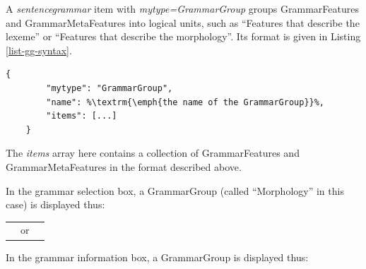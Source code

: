 \documentclass[11pt,oneside,a4paper]{memoir}
\begin{document}
A \emph{sentencegrammar} item with \emph{mytype=GrammarGroup} groups GrammarFeatures and
GrammarMetaFeatures into logical units, such as ``Features that describe the lexeme'' or ``Features
that describe the morphology''. Its format is given in Listing \ref{list-gg-syntax}.

\begin{lstlisting}[caption=GrammarGroup syntax,label=list-gg-syntax]
    {
        "mytype": "GrammarGroup",
        "name": %\textrm{\emph{the name of the GrammarGroup}}%,
        "items": [...]
    }
\end{lstlisting}

The \emph{items} array here contains a collection of GrammarFeatures and GrammarMetaFeatures in the
format described above.

\Needspace*{5cm}%
In the grammar selection box, a GrammarGroup (called ``Morphology'' in
this case) is displayed thus:

\begin{center}
\begin{tabular}{rcl}
  \vspace{0pt}\parbox{0.3\textwidth}{\includegraphics[width=0.3\textwidth]{morph1a.png}} %
 & or &
  \vspace{0pt}\parbox{0.3\textwidth}{\includegraphics[width=0.3\textwidth]{morph1b.png}}
\end{tabular}
\end{center}

\Needspace*{5cm}%
In the grammar information box, a GrammarGroup is displayed thus:
\end{document}
